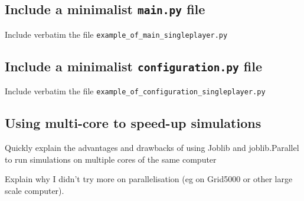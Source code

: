 \subsection{Include a minimalist \texttt{main.py} file}

Include verbatim the file
\texttt{example\_of\_main\_singleplayer.py}


\subsection{Include a minimalist \texttt{configuration.py} file}

Include verbatim the file
\texttt{example\_of\_configuration\_singleplayer.py}


\subsection{Using multi-core to speed-up simulations}

Quickly explain the advantages and drawbacks of using Joblib and joblib.Parallel to run simulations on multiple cores of the same computer

Explain why I didn't try more on parallelisation (eg on Grid5000 or other large scale computer).
